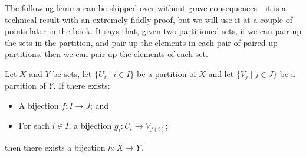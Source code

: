 The following lemma can be skipped over without grave consequences---it is a technical result with an extremely fiddly proof, but we will use it at a couple of points later in the book. It says that, given two partitioned sets, if we can pair up the sets in the partition, and pair up the elements in each pair of paired-up partitions, then we can pair up the elements of each set.

\begin{lemma}
\label{lemBijectionBetweenPartitionAndComponentsInducesBijectionOfSets}
Let $X$ and $Y$ be sets, let $\{ U_i \mid i \in I \}$ be a partition of $X$ and let $\{ V_j \mid j \in J \}$ be a partition of $Y$. If there exists:
\begin{itemize}
\item A bijection $f : I \to J$; and
\item For each $i \in I$, a bijection $g_i : U_i \to V_{f(i)}$;
\end{itemize}
then there exists a bijection $h : X \to Y$.
\end{lemma}

